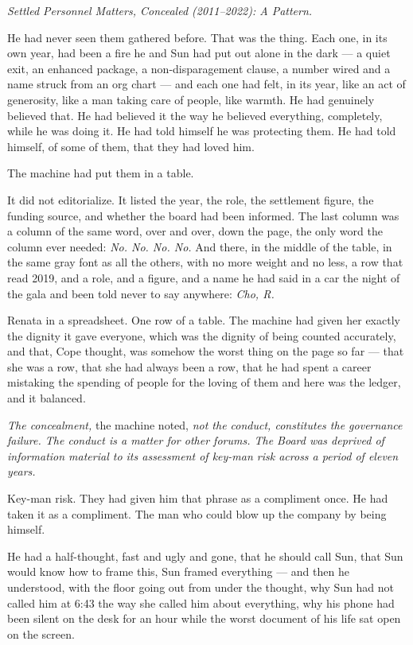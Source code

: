 \documentclass[11pt,openany]{book}
\begin{document}
\textit{Settled Personnel Matters, Concealed (2011--2022): A Pattern.}

He had never seen them gathered before. That was the thing. Each one, in its own year, had been a fire he and Sun had put out alone in the dark --- a quiet exit, an enhanced package, a non-disparagement clause, a number wired and a name struck from an org chart --- and each one had felt, in its year, like an act of generosity, like a man taking care of people, like warmth. He had genuinely believed that. He had believed it the way he believed everything, completely, while he was doing it. He had told himself he was protecting them. He had told himself, of some of them, that they had loved him.

The machine had put them in a table.

It did not editorialize. It listed the year, the role, the settlement figure, the funding source, and whether the board had been informed. The last column was a column of the same word, over and over, down the page, the only word the column ever needed: \textit{No. No. No. No.} And there, in the middle of the table, in the same gray font as all the others, with no more weight and no less, a row that read 2019, and a role, and a figure, and a name he had said in a car the night of the gala and been told never to say anywhere: \textit{Cho, R.}

Renata in a spreadsheet. One row of a table. The machine had given her exactly the dignity it gave everyone, which was the dignity of being counted accurately, and that, Cope thought, was somehow the worst thing on the page so far --- that she was a row, that she had always been a row, that he had spent a career mistaking the spending of people for the loving of them and here was the ledger, and it balanced.

\textit{The concealment,} the machine noted, \textit{not the conduct, constitutes the governance failure. The conduct is a matter for other forums. The Board was deprived of information material to its assessment of key-man risk across a period of eleven years.}

Key-man risk. They had given him that phrase as a compliment once. He had taken it as a compliment. The man who could blow up the company by being himself.

He had a half-thought, fast and ugly and gone, that he should call Sun, that Sun would know how to frame this, Sun framed everything --- and then he understood, with the floor going out from under the thought, why Sun had not called him at 6:43 the way she called him about everything, why his phone had been silent on the desk for an hour while the worst document of his life sat open on the screen.
\end{document}
